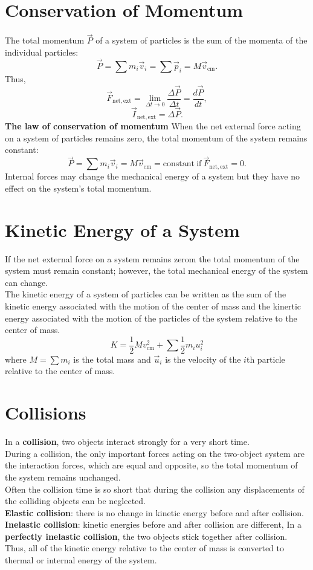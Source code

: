 \documentclass[11pt,letter]{report}
\begin{document}
\section{Conservation of Momentum}
The total momentum $\vec{P}$ of a system of particles is the sum of the momenta of the individual particles: $$\vec{P} = \sum m_i \vec{v}_i = \sum \vec{p}_i = M \vec{v}_\mathrm{cm}.$$
Thus, $$\vec{F}_\mathrm{net, ext} = \lim_{\Delta{t} \to 0}{\frac{\Delta{\vec{P}}}{\Delta{t}}} = \frac{d\vec{P}}{dt},$$ $$\vec{I}_\mathrm{net, ext} = \Delta{\vec{P}}.$$
\textbf{The law of conservation of momentum} When the net external force acting on a system of particles remains zero, the total momentum of the system remains constant: $$\vec{P} = \sum m_i \vec{v}_i = M \vec{v}_\mathrm{cm} = \mathrm{constant\ if\ } \vec{F}_\mathrm{net, ext} = 0.$$
Internal forces may change the mechanical energy of a system but they have no effect on the system's total momentum.


\section{Kinetic Energy of a System}
If the net external force on a system remains zerom the total momentum of the system must remain constant; however, the total mechanical energy of the system can change.
\\The kinetic energy of a system of particles can be written as the sum of the kinetic energy associated with the motion of the center of mass and the kinertic energy associated with the motion of the particles of the system relative to the center of mass.
$$K = \frac{1}{2} M v_\mathrm{cm}^2 + \sum \frac{1}{2} m_i u_i^2$$ where $M = \sum{m_i}$ is the total mass and $\vec{u}_i$ is the velocity of the $i$th particle relative to the center of mass.


\section{Collisions}
In a \textbf{collision}, two objects interact strongly for a very short time.
\\During a collision, the only important forces acting on the two-object system are the interaction forces, which are equal and opposite, so the total momentum of the system remains unchanged.
\\Often the collision time is so short that during the collision any displacements of the colliding objects can be neglected.
\\\textbf{Elastic collision}: there is no change in kinetic energy before and after collision.
\\\textbf{Inelastic collision}: kinetic energies before and after collision are different, In a \textbf{perfectly inelastic collision}, the two objects stick together after collision. Thus, all of the kinetic energy relative to the center of mass is converted to thermal or internal energy of the system.
\end{document}
